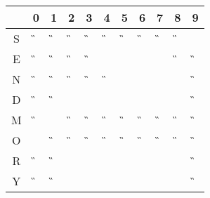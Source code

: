 \begin{tabular}{|c|c|c|c|c|c|c|c|c|c|c|}\hline
  & 0 & 1 & 2 & 3 & 4 & 5 & 6 & 7 & 8 & 9 \\ \hline
S &\G &\G &\G &\G &\G &\G &\G &\G &\G &\A \\ \hline
E &\G &\G &\G &\G &\X &\F &\X &\X &\G &\G \\ \hline
N &\G &\G &\G &\G &\G &   &   &   &   &\G \\ \hline
D &\G &\G &   &   &   &   &   &   &   &\G \\ \hline
M &\G &\A &\G &\G &\G &\G &\G &\G &\G &\G \\ \hline
O &\A &\G &\G &\G &\G &\G &\G &\G &\G &\G \\ \hline
R &\G &\G &   &   &   &   &   &   &   &\G \\ \hline
Y & \G&\G &   &   &   &   &   &   &   &\G \\ \hline
\end{tabular}
